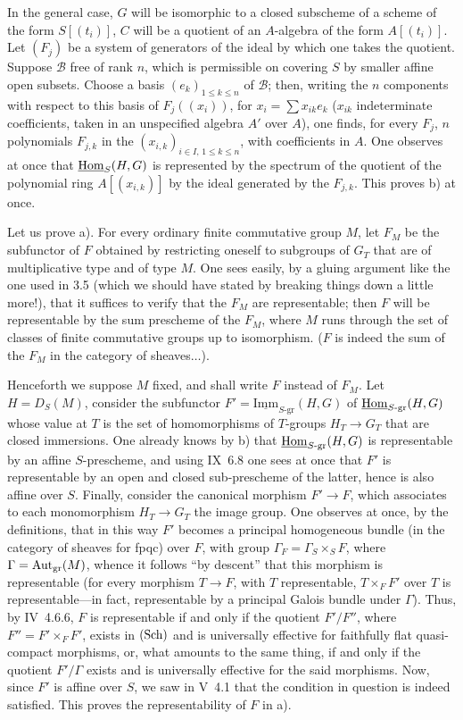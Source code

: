 In the general case, $G$ will be isomorphic to a closed subscheme of a scheme of the form $S[(t_i)]$, \ie $C$ will be a quotient of an $A$-algebra of the form $A[(t_i)]$. Let $(F_j)$ be a system of generators of the ideal by which one takes the quotient. Suppose $\mathscr B$ free of rank $n$, which is permissible on covering $S$ by smaller affine open subsets. Choose a basis $(e_k)_{1\le k\le n}$ of $\mathscr B$; then, writing the $n$ components with respect to this basis of $F_j((x_i))$, for $x_i=\sum x_{ik}e_k$ ($x_{ik}$ indeterminate coefficients, taken in an unspecified algebra $A'$ over $A$), one finds, for every $F_j$, $n$ polynomials $F_{j,k}$ in the $(x_{i,k})_{i\in I,\,1\le k\le n}$, with coefficients in $A$. One observes at once that $\underline{\operatorname{Hom}}_S(H,G)$ is represented by the spectrum of the quotient of the polynomial ring $A[(x_{i,k})]$ by the ideal generated by the $F_{j,k}$. This proves b) at once.

Let us prove a). For every ordinary finite commutative group $M$, let $F_M$ be the subfunctor of $F$ obtained by restricting oneself to subgroups of $G_T$ that are of multiplicative type and of type $M$. One sees easily, by a gluing argument like the one used in 3.5 (which we should have stated by breaking things down a little more!), that it suffices to verify that the $F_M$ are representable; then $F$ will be representable by the sum prescheme of the $F_M$, where $M$ runs through the set of classes of finite commutative groups up to isomorphism. ($F$ is indeed the sum of the $F_M$ in the category of sheaves$\ldots$).

Henceforth we suppose $M$ fixed, and shall write $F$ instead of $F_M$. Let $H=D_S(M)$, consider the subfunctor $F'=\underline{\mathrm{Imm}}_{S\text{-gr}}(H,G)$ of $\underline{\operatorname{Hom}}_{S\text{-gr}}(H,G)$ whose value at $T$ is the set of homomorphisms of $T$-groups $H_T\to G_T$ that are closed immersions. One already knows by b) that $\underline{\operatorname{Hom}}_{S\text{-gr}}(H,G)$ is representable by an affine $S$-prescheme, and using IX~6.8 one sees at once that $F'$ is representable by an open and closed sub-prescheme of the latter, hence is also affine over $S$. Finally, consider the canonical morphism $F'\to F$, which associates to each monomorphism $H_T\to G_T$ the image group. One observes at once, by the definitions, that in this way $F'$ becomes a principal homogeneous bundle (in the category of sheaves for fpqc) over $F$, with group $\Gamma_F=\Gamma_S\times_S F$, where $\Gamma=\operatorname{Aut}_{\mathrm{gr}}(M)$, whence it follows ``by descent'' that this morphism is representable (\ie for every morphism $T\to F$, with $T$ representable, $T\times_F F'$ over $T$ is representable---in fact, representable by a principal Galois bundle under $\Gamma$). Thus, by IV~4.6.6, $F$ is representable if and only if the quotient $F'/F''$, where $F''=F'\times_F F'$, exists in $\textup{(Sch)}$ and is universally effective for faithfully flat quasi-compact morphisms, or, what amounts to the same thing, if and only if the quotient $F'/\Gamma$ exists and is universally effective for the said morphisms. Now, since $F'$ is affine over $S$, we saw in V~4.1 that the condition in question is indeed satisfied. This proves the representability of $F$ in a).

